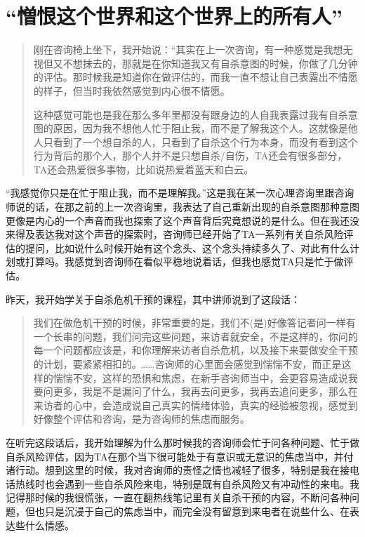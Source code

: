 \chapter{“憎恨这个世界和这个世界上的所有人”}



\blockquote{
    刚在咨询椅上坐下，我开始说：“其实在上一次咨询，有一种感觉是我想无视但又不想抹去的，那就是在你知道我又有自杀意图的时候，你做了几分钟的评估。那时候我是知道你在做评估的，而我一直不想让自己表露出不情愿的样子，但当时我依然感觉到内心很不情愿。
    
    这种感觉可能也是我在那么多年里都没有跟身边的人自我表露过我有自杀意图的原因，因为我不想他人忙于阻止我，而不是了解我这个人。这就像是他人只看到了一个想自杀的人，只看到了自杀这个行为本身，而没有看到这个行为背后的那个人，那个人并不是只想自杀/自伤，TA还会有很多部分，TA还会热爱很多事物，比如说热爱着蓝天和白云。
    
}

“我感觉你只是在忙于阻止我，而不是理解我。”这是我在某一次心理咨询里跟咨询师说的话，在那之前的上一次咨询里，我表达了自己重新出现的自杀意图\pozhehao{}那种意图更像是内心的一个声音\pozhehao{}而我也探索了这个声音背后究竟想说的是什么。但在我还没来得及表达我对这个声音的探索时，咨询师已经开始了TA一系列有关自杀风险评估的提问，比如说什么时候开始有这个念头、这个念头持续多久了、对此有什么计划或打算吗。我感觉到咨询师在看似平稳地说着话，但我也感觉TA只是忙于做评估。

昨天，我开始学关于自杀危机干预的课程，其中讲师说到了这段话：

\blockquote{
我们在做危机干预的时候，非常重要的是，我们不(是)好像答记者问一样有一个长串的问题，我们问完这些问题，来访者就安全，不是这样的，你问的每一个问题都应该是，和你理解来访者自杀危机，以及接下来要做安全干预的计划，要紧紧相扣的。……咨询师的心里面会感觉到惴惴不安，而正是这样的惴惴不安，这样的恐惧和焦虑，在新手咨询师当中，会更容易造成说我要问更多，我是不是漏问了什么，我再去问更多，我再去追问更多，那么在来访者的心中，会造成说自己真实的情绪体验，真实的经验被忽视，感觉到好像整个评估和咨询，是为咨询师的焦虑而服务。
}
在听完这段话后，我开始理解为什么那时候我的咨询师会忙于问各种问题、忙于做自杀风险评估，因为TA在那个当下很可能处于有意识或无意识的焦虑当中，并付诸行动。想到这里的时候，我对咨询师的责怪之情也减轻了很多，特别是我在接电话热线时也会遇到一些自杀风险来电，特别是既有自杀风险又有冲动性的来电。我记得那时候的我很慌张，一直在翻热线笔记里有关自杀干预的内容，不断问各种问题，但也只是沉浸于自己的焦虑当中，而完全没有留意到来电者在说些什么、在表达些什么情感。

